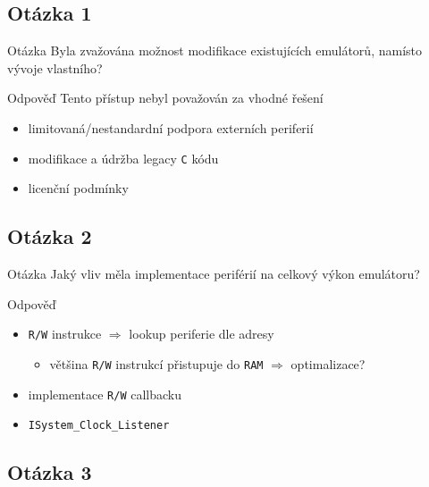 \documentclass[compress]{beamer}
\begin{document}
\subsection{Otázka 1}

\begin{frame}
	\begin{block}{Otázka}
		Byla zvažována možnost modifikace existujících emulátorů, namísto vývoje vlastního?
	\end{block}
	\begin{block}{Odpověď}
		Tento přístup nebyl považován za vhodné řešení
		\begin{itemize}
			\item limitovaná/nestandardní podpora externích periferií
			\item modifikace a údržba legacy \texttt{C} kódu
			\item licenční podmínky
		\end{itemize}
	\end{block}
\end{frame}

\subsection{Otázka 2}

\begin{frame}
	\begin{block}{Otázka}
		Jaký vliv měla implementace periférií na celkový výkon emulátoru?
	\end{block}
	\begin{block}{Odpověď}
		\begin{itemize}
			\item \texttt{R/W} instrukce $\Rightarrow$ lookup periferie dle adresy
			\begin{itemize}
				\item většina \texttt{R/W} instrukcí přistupuje do \texttt{RAM} $\Rightarrow$ optimalizace?
			\end{itemize}
			\item implementace \texttt{R/W} callbacku
			\item \texttt{ISystem\_Clock\_Listener} 
		\end{itemize}
	\end{block}
\end{frame}

\subsection{Otázka 3}
\end{document}
